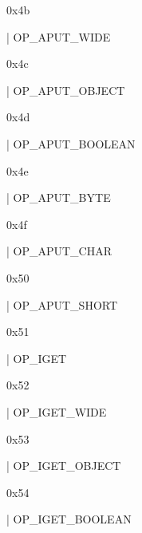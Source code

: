 \documentclass[11pt]{article}
\begin{document}
\begin{ocamldoccomment}
0x4b
\end{ocamldoccomment}
\begin{ocamldoccode}
  | OP_APUT_WIDE
\end{ocamldoccode}
\begin{ocamldoccomment}
0x4c
\end{ocamldoccomment}
\begin{ocamldoccode}
  | OP_APUT_OBJECT
\end{ocamldoccode}
\begin{ocamldoccomment}
0x4d
\end{ocamldoccomment}
\begin{ocamldoccode}
  | OP_APUT_BOOLEAN
\end{ocamldoccode}
\begin{ocamldoccomment}
0x4e
\end{ocamldoccomment}
\begin{ocamldoccode}
  | OP_APUT_BYTE
\end{ocamldoccode}
\begin{ocamldoccomment}
0x4f
\end{ocamldoccomment}
\begin{ocamldoccode}
  | OP_APUT_CHAR
\end{ocamldoccode}
\begin{ocamldoccomment}
0x50
\end{ocamldoccomment}
\begin{ocamldoccode}
  | OP_APUT_SHORT
\end{ocamldoccode}
\begin{ocamldoccomment}
0x51
\end{ocamldoccomment}
\begin{ocamldoccode}
  | OP_IGET
\end{ocamldoccode}
\begin{ocamldoccomment}
0x52
\end{ocamldoccomment}
\begin{ocamldoccode}
  | OP_IGET_WIDE
\end{ocamldoccode}
\begin{ocamldoccomment}
0x53
\end{ocamldoccomment}
\begin{ocamldoccode}
  | OP_IGET_OBJECT
\end{ocamldoccode}
\begin{ocamldoccomment}
0x54
\end{ocamldoccomment}
\begin{ocamldoccode}
  | OP_IGET_BOOLEAN
\end{ocamldoccode}
\end{document}
